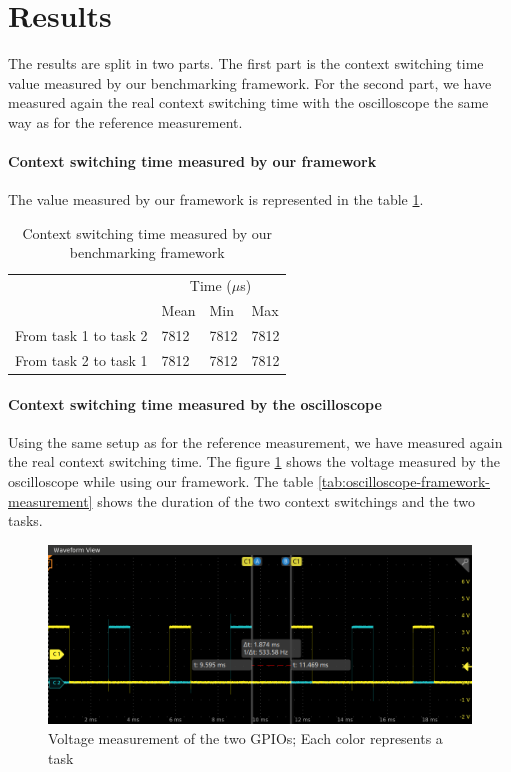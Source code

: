 \section{Results}

The results are split in two parts.
The first part is the context switching time value measured by our benchmarking framework.
For the second part, we have measured again the real context switching time with the oscilloscope the same way as for the reference measurement.

\paragraph{Context switching time measured by our framework} 
The value measured by our framework is represented in the table \ref{tab:framework-measurement}.

\begin{table}[!ht]
  \centering
  \begin{tabular}{llll}
                        & \multicolumn{3}{c}{Time ($\mu$s)}          \\ \cline{2-4} 
                        & \multicolumn{1}{c}{Mean} & Min  & Max  \\ \cline{2-4} 
  From task 1 to task 2 & 7812                     & 7812 & 7812 \\
  From task 2 to task 1 & 7812                     & 7812 & 7812
  \end{tabular}
  \caption{Context switching time measured by our benchmarking framework}
  \label{tab:framework-measurement}
  \end{table}

\paragraph{Context switching time measured by the oscilloscope}
Using the same setup as for the reference measurement, we have measured again the real context switching time.
The figure \ref{fig:framework-value-wave} shows the voltage measured by the oscilloscope while using our framework.
The table \ref{tab:oscilloscope-framework-measurement} shows the duration of the two context switchings and the two tasks.

\begin{figure}[!ht]
  \centering
  \includegraphics[scale=0.5]{assets/framework-value-wave.png}
  \caption{\label{fig:framework-value-wave}Voltage measurement of the two GPIOs; Each color represents a task}
\end{figure}

